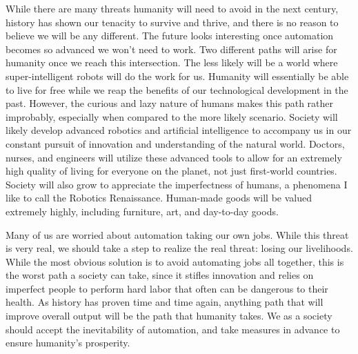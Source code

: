 While there are many threats humanity will need to avoid in the next century, history has shown our tenacity to survive and thrive, and there is no reason to believe we will be any different. The future looks interesting once automation becomes so advanced we won't need to work. Two different paths will arise for humanity once we reach this intersection. The less likely will be a world where super-intelligent robots will do the work for us. Humanity will essentially be able to live for free while we reap the benefits of our technological development in the past. However, the curious and lazy nature of humans makes this path rather improbably, especially when compared to the more likely scenario. Society will likely develop advanced robotics and artificial intelligence to accompany us in our constant pursuit of innovation and understanding of the natural world. Doctors, nurses, and engineers will utilize these advanced tools to allow for an extremely high quality of living for everyone on the planet, not just first-world countries. Society will also grow to appreciate the imperfectness of humans, a phenomena I like to call the Robotics Renaissance. Human-made goods will be valued extremely highly, including furniture, art, and day-to-day goods.

Many of us are worried about automation taking our own jobs. While this threat is very real, we should take a step to realize the real threat: losing our livelihoods. While the most obvious solution is to avoid automating jobs all together, this is the worst path a society can take, since it stifles innovation and relies on imperfect people to perform hard labor that often can be dangerous to their health. As history has proven time and time again, anything path that will improve overall output will be the path that humanity takes. We as a society should accept the inevitability of automation, and take measures in advance to ensure humanity's prosperity.
